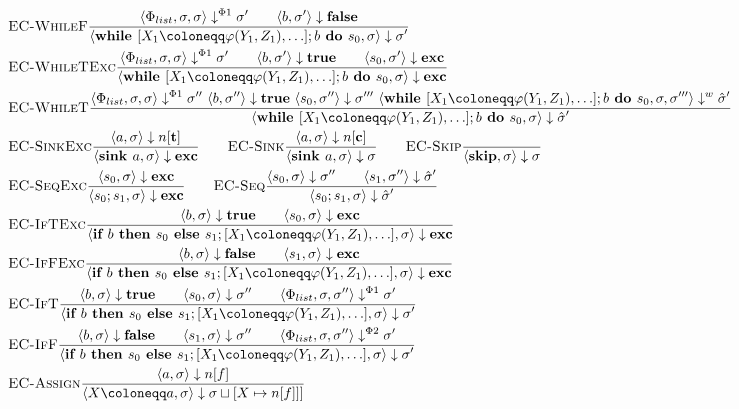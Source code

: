 \begin{align*}
    &\bsrule{EC-WhileF}{\bigsteppl{\philist}{\store}{\store}{\store'} \qquad
        \bigstep{b}{\sigma'}{\bfalse}}
    {\bigstep{\defaultssawhile}{\store}{\store'}}\\
    &\bsrule{EC-WhileTExc}{\bigsteppl{\philist}{\store}{\store}{\store'} \qquad
    \bigstep{b}{\store'}{\btrue} \qquad 
    \bigstep{s_0}{\store'}{\exception}}
    {\bigstep{\defaultssawhile}{\sigma}{\exception}}\\
    &\bsrule{EC-WhileT}{\bigsteppl{\philist}{\store}{\store}{\store''} \ 
        \bigstep{b}{\store''}{\btrue} \ 
    \bigstep{s_0}{\store''}{\store'''} \ 
    \bigstepw{\defaultssawhile}{\store}{\store'''}{\excstore'}}
    {\bigstep{\defaultssawhile}{\store}{\excstore'}}\\
    &\bsrule{EC-SinkExc}{\bigstep{a}{\store}{\tracked{}}}
    {\bigstep{\defaultsink}{\store}{\exception}} \qquad
    \bsrule{EC-Sink}{\bigstep{a}{\store}{\clean{}}}
    {\bigstep{\defaultsink}{\store}{\store}} \qquad
    \bsrule{EC-Skip}{}{\bigstep{\skipcmd}{\store}{\store}}\\
    &\bsrule{EC-SeqExc}{\bigstep{s_0}{\sigma}{\exception}}
    {\bigstep{\defaultssaseq}{\store}{\exception}} \qquad
    \bsrule{EC-Seq}{\bigstep{s_0}{\sigma}{\store''} \qquad \bigstep{s_1}{\store''}{\excstore'}}
    {\bigstep{\defaultssaseq}{\store}{\excstore'}}\\
    &\bsrule{EC-IfTExc}{\bigstep{b}{\store}{\btrue}\qquad \bigstep{s_0}{\store}{\exception}}
    {\bigstep{\defaultssaif}{\store}{\exception}}\\
    &\bsrule{EC-IfFExc}{\bigstep{b}{\store}{\bfalse}\qquad \bigstep{s_1}{\store}{\exception}}
    {\bigstep{\defaultssaif}{\store}{\exception}}\\
    &\bsrule{EC-IfT}{\bigstep{b}{\store}{\btrue}\qquad \bigstep{s_0}{\store}{\store''}
    \qquad \bigsteppl{\philist}{\sigma}{\sigma''}{\sigma'}}
    {\bigstep{\defaultssaif}{\store}{\store'}}\\
    &\bsrule{EC-IfF}{\bigstep{b}{\store}{\bfalse}\qquad \bigstep{s_1}{\store}{\store''}
    \qquad \bigsteppr{\philist}{\sigma}{\sigma''}{\sigma'}}
    {\bigstep{\defaultssaif}{\store}{\store'}}\\
    &\bsrule{EC-Assign}{\bigstep{a}{\store}{\flagged{}}}
    {\bigstep{\defaultstore}{\store}{\storeassign{\store}{X \mapsto \flagged{}]}}}\\
\end{align*}

